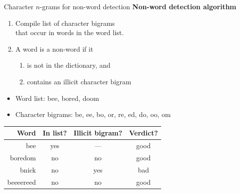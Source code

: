 \documentclass[professionalfonts, xcolor={usenames,svgnames,x11names,table}]{beamer}
\begin{document}
\begin{frame}{Character $n$-grams for non-word detection}
    \textbf{Non-word detection algorithm}
    \begin{enumerate}
        \item Compile list of character bigrams\\
              that occur in words in the word list.
        \item A word is a non-word if it
            \begin{enumerate}
                \item is not in the dictionary, and
                \item contains an illicit character bigram
            \end{enumerate}
    \end{enumerate}

    \begin{example}
        \begin{itemize}
            \item Word list: bee, bored, doom
            \item Character bigrams: be, ee, bo, or, re, ed, do, oo, om
        \end{itemize}

        \centering
        \begin{tabular}{rccc}
            \toprule
            \textbf{Word} & \textbf{In list?} & \textbf{Illicit bigram?} & \textbf{Verdict?}\\            
            \midrule
            bee & yes & --- & good\\
            boredom & no & no & good\\
            bnick & no & yes & bad\\
            beeeereed & no & no & good\\
            \bottomrule
        \end{tabular}
    \end{example}
\end{frame}
\end{document}
